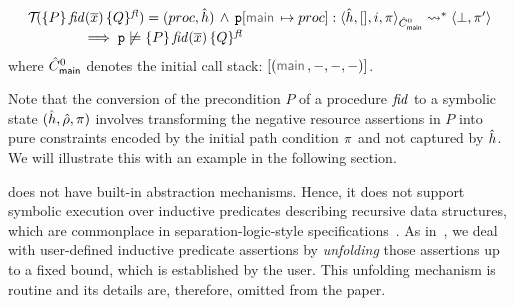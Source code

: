 \begin{theorem}\label{teo:bug:finding:sl}
$$
\begin{array}{l}
\testify{}(\specsig{P}{\fid(\jvec{x})}{Q}{\flag})  = (\proc, \sheap) \, \wedge \, 
   \prog[\jsilmain \mapsto \proc] : \symbtranstranserr{\sheap, [], i, \pc}{\sctxmain}{\pc'} \\
  \qquad \qquad \implies
        \prog \not\satisfies \specsig{P}{\fid(\jvec{x})}{Q}{\flag}
\end{array}
$$
\noindent where $\hat{C}_{\sf main}^0$ denotes the initial call stack: $[ (\jsilmain, -, -, -) ]$.
\end{theorem}


Note that the conversion of the 
precondition $P$ of a \jsil procedure $\mathit{fid}$ to a symbolic state $(\hat{h}, \hat\rho, \pi)$ involves transforming the negative resource assertions in $P$ into pure constraints encoded by the initial path condition $\pi$ and not captured by $\hat{h}$.
We will illustrate this with an example in the following section. 

\cosette does not have built-in abstraction mechanisms. Hence, it does not support symbolic
execution over inductive predicates describing recursive data structures, which are 
commonplace in separation-logic-style specifications~\cite{smallf, berdine:aplas:2005}. 
As in~\cite{korat}, we deal with user-defined inductive predicate assertions by \emph{unfolding} 
those assertions up to a fixed bound, which is established by the user. This unfolding mechanism 
is routine
and its details are, therefore, omitted from the paper. 